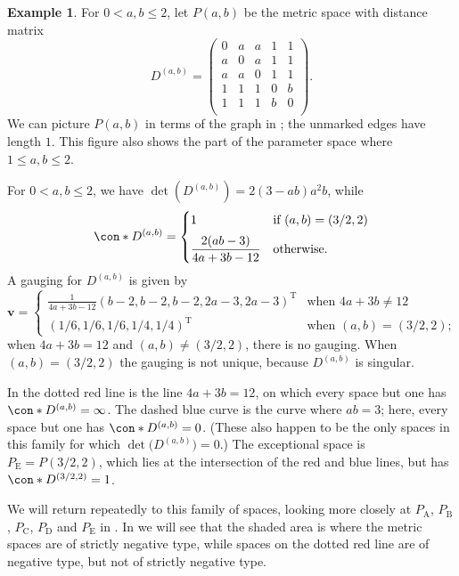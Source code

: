 \documentclass[a4paper, oneside, reqno]{amsart}
\theoremstyle{definition}
\newtheorem{example}[theorem]{Example}
\theoremstyle{remark}
\numberwithin{equation}{section}
\renewcommand{\vec}{\mathbf}
\newcommand{\transpose}{\mathrm{T}}
\begin{document}
\begin{example}
\label{eg:five-points}
    For \(0 < a, b \le 2\), let \(P(a, b)\) be the metric space with distance matrix
\[
    D^{(a, b)}
    =
    \begin{pmatrix}
        0 & a & a & 1 & 1 \\
        a & 0 & a & 1 & 1 \\
        a & a & 0 & 1 & 1 \\
        1 & 1 & 1 & 0 & b \\
        1 & 1 & 1 & b & 0 \\
    \end{pmatrix}.
\]
    We can picture \(P(a, b)\) in terms of the graph in ; the unmarked edges have length \(1\).  This figure also shows the part of the parameter space where \(1 \le a, b \le 2\).

    For \(0 < a,b \le 2\), we have \(\det(D^{(a, b)}) = 2(3 - ab)a^2b\), while
    \[
    \con*{D^{(a, b)}} = 
        \begin{cases}
            1
            &
            \text{if } (a, b) = (3/2, 2)
            \\[0.5em]
            \dfrac{2(ab-3)}{4a + 3b - 12} 
            & 
            \text{otherwise.}
            \\[0.4em]
        \end{cases}
    \]    
    A gauging for \(D^{(a, b)}\) is given by 
    \[
        \vec{v} 
        = 
        \begin{cases}
            \tfrac{1}{4a + 3b - 12}(b-2, b-2, b-2, 2a - 3, 2a - 3)^\transpose
            &
            \text{when } 4a + 3b \neq 12
            \\[0.1em]
            (1/6, 1/6, 1/6, 1/4, 1/4)^\transpose
            &
            \text{when } (a, b) = (3/2, 2);    
        \end{cases}
    \]
    when \(4a+3b = 12\) and \((a,b) \neq (3/2,2)\), there is no gauging. When \((a,b) = (3/2,2)\) the gauging is not unique, because \(D^{(a,b)}\) is singular.
    
    In  the dotted red line is the line \(4a + 3b = 12\), on which every space but one has \(\con*{D^{(a,b)}} = \infty\). The dashed blue curve is the curve where \(ab = 3\); here, every space but one has \(\con*{D^{(a,b)}} = 0\). (These also happen to be the only spaces in this family for which \(\det\bigl(D^{(a,b)}\bigr) = 0\).) The exceptional space is \(P_{\mathrm{E}} = P(3/2, 2)\), which lies at the intersection of the red and blue lines, but has \(\con*{D^{(3/2, 2)}} = 1\).

    We will return repeatedly to this family of spaces, looking more closely at \(P_{\mathrm{A}}\), \(P_{\mathrm{B}}\), \(P_{\mathrm{C}}\), \(P_{\mathrm{D}}\) and \(P_{\mathrm{E}}\) in . In  we will see that the shaded area is where the metric spaces are of strictly negative type, while spaces on the dotted red line are of negative type, but not of strictly negative type.
\end{example}
\end{document}
